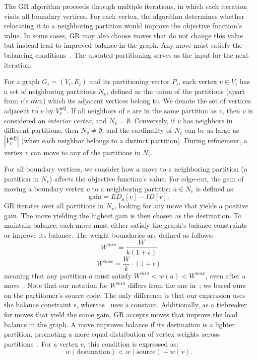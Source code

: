 The GR algorithm proceeds through multiple iterations, in which each iteration visits all boundary vertices. For each vertex, the algorithm determines whether relocating it to a neighboring partition would improve the objective function's value. In some cases, GR may also choose moves that do not change this value but instead lead to improved balance in the graph. Any move must satisfy the balancing conditions~\cite{karypis_multilevelk-way_1998}. The updated partitioning serves as the input for the next iteration.

For a graph $G_i = (V_i, E_i)$ and its partitioning vector $P_i$, each vertex $v \in V_i$ has a set of neighboring partitions $N_v$, defined as the union of the partitions (apart from $v$'s own) which its adjacent vertices belong to. We denote the set of vertices adjacent to $v$ by $V^{\mathrm{adj}}_v$. If all neighbors of $v$ are in the same partition as $v$, then $v$ is considered an \textit{interior vertex}, and $N_v = \emptyset$. Conversely, if $v$ has neighbors in different partitions, then $N_v \neq \emptyset$, and the cardinality of $N_v$ can be as large as $|V^{\mathrm{adj}}_v|$ (when each neighbor belongs to a distinct partition). During refinement, a vertex $v$ can move to any of the partitions in $N_v$.
 
For all boundary vertices, we consider how a move to a neighboring partition (a partition in $N_v$) affects the objective function's value. For edge-cut, the gain of moving a boundary vertex $v$ to a neighboring partition $a \in N_v$ is defined as:
\begin{equation} \label{gain_specific_edgecut}
	\mathrm{gain} = ED_a[v] - ID[v].
\end{equation}
GR iterates over all partitions in $N_v$, looking for any move that yields a positive gain. The move yielding the highest gain is then chosen as the destination.
To maintain balance, each move must either satisfy the graph's balance constraints or improve its balance. The weight boundaries are defined as follows:
\[
W^{min} = \frac{W}{k(1 + \epsilon)}
\] 
\[
W^{max} = \frac{W}{k} \cdot (1 + \epsilon)
\]
meaning that any partition $a$ must satisfy $W^{min} < w(a) < W^{max}$, even after a move~\cite{karypis_multilevelk-way_1998}. Note that our notation for $W^{min}$ differs from the one in~\cite{karypis_multilevelk-way_1998}; we based ours on the partitioner's source code. The only difference is that our expression uses the balance constraint $\epsilon$, whereas~\cite{karypis_multilevelk-way_1998} uses a constant. Additionally, as a tiebreaker for moves that yield the same gain, GR accepts moves that improve the load balance in the graph. A move improves balance if its destination is a lighter partition, promoting a more equal distribution of vertex weights across partitions~\cite{karypis_multilevelk-way_1998}.
For a vertex $v$, this condition is expressed as:
\[
	w(\mathrm{destination}) < w(\mathrm{source}) - w(v).
\]

